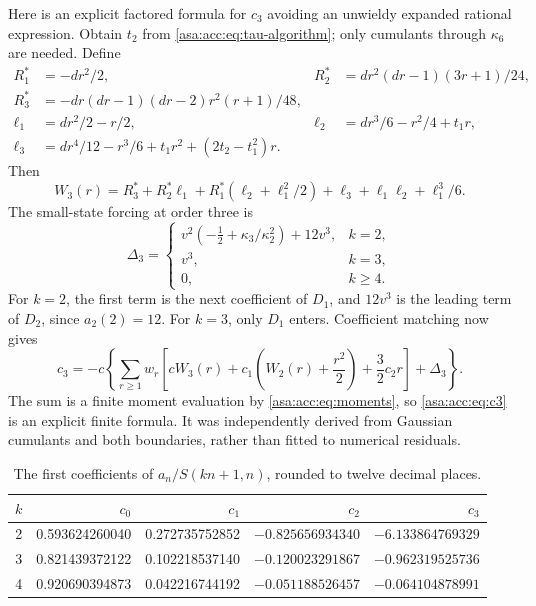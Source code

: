 \documentclass[11pt,letterpaper]{article}
\theoremstyle{remark}\newtheorem{remark}[theorem]{Remark}
\numberwithin{equation}{section}
\begin{document}
Here is an explicit factored formula for $c_3$ avoiding an unwieldy expanded rational expression. Obtain $t_2$ from \eqref{asa:acc:eq:tau-algorithm}; only cumulants through $\kappa_6$ are needed. Define
\begin{align*}
R_1^*&=-dr^2/2,&
R_2^*&=dr^2(dr-1)(3r+1)/24,\\
R_3^*&=-dr(dr-1)(dr-2)r^2(r+1)/48,\\
\ell_1&=dr^2/2-r/2,&
\ell_2&=dr^3/6-r^2/4+t_1r,\\
\ell_3&=dr^4/12-r^3/6+t_1r^2+(2t_2-t_1^2)r.
\end{align*}
Then
\begin{equation}\label{asa:acc:eq:W3}
W_3(r)=R_3^*+R_2^*\ell_1+R_1^*(\ell_2+\ell_1^2/2)
+\ell_3+\ell_1\ell_2+\ell_1^3/6.
\end{equation}
The small-state forcing at order three is
\begin{equation}\label{asa:acc:eq:D3}
\Delta_3=\begin{cases}
v^2(-\tfrac12+\kappa_3/\kappa_2^2)+12v^3,&k=2,\\
v^3,&k=3,\\
0,&k\ge4.
\end{cases}
\end{equation}
For $k=2$, the first term is the next coefficient of $D_1$, and $12v^3$ is the leading term of $D_2$, since $a_2(2)=12$. For $k=3$, only $D_1$ enters. Coefficient matching now gives
\begin{equation}\label{asa:acc:eq:c3}
c_3=-c\left\{\sum_{r\ge1}w_r
\left[cW_3(r)+c_1\left(W_2(r)+\frac{r^2}{2}\right)
+\frac32c_2r\right]+\Delta_3\right\}.
\end{equation}
The sum is a finite moment evaluation by \eqref{asa:acc:eq:moments}, so \eqref{asa:acc:eq:c3} is an explicit finite formula. It was independently derived from Gaussian cumulants and both boundaries, rather than fitted to numerical residuals.

\begin{table}[ht]
\centering\small
\begin{tabular}{crrrr}
\toprule
$k$&$c_0$&$c_1$&$c_2$&$c_3$\\
\midrule
2&0.593624260040&0.272735752852&$-0.825656934340$&$-6.133864769329$\\
3&0.821439372122&0.102218537140&$-0.120023291867$&$-0.962319525736$\\
4&0.920690394873&0.042216744192&$-0.051188526457$&$-0.064104878991$\\
\bottomrule
\end{tabular}
\caption{The first coefficients of $a_n/S(kn+1,n)$, rounded to twelve decimal places.}
\label{asa:acc:tab:coeffs}
\end{table}
\end{document}
